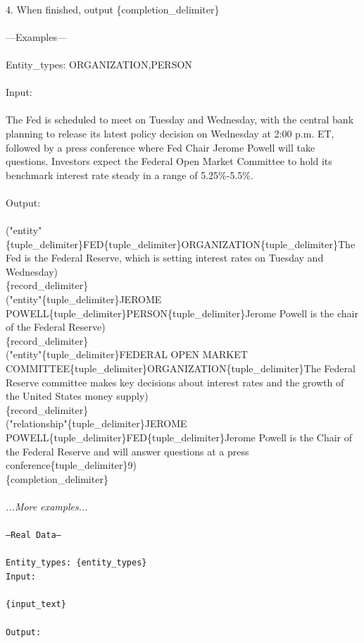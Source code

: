 \documentclass{article}
\begin{document}
{\\
4. When finished, output \{completion\_delimiter\}\\
\\
---Examples---\\
\\
Entity\_types: ORGANIZATION,PERSON\\
\\
Input:\\
\\
The Fed is scheduled to meet on Tuesday and Wednesday, with the central bank planning to release its latest policy decision on Wednesday at 2:00 p.m. ET, followed by a press conference where Fed Chair Jerome Powell will take questions. Investors expect the Federal Open Market Committee to hold its benchmark interest rate steady in a range of 5.25\%-5.5\%.\\
\\
Output:\\
\\
("entity"\{tuple\_delimiter\}FED\{tuple\_delimiter\}ORGANIZATION\{tuple\_delimiter\}The Fed is the Federal Reserve, which is setting interest rates on Tuesday and Wednesday)\\
\{record\_delimiter\}\\
("entity"\{tuple\_delimiter\}JEROME POWELL\{tuple\_delimiter\}PERSON\{tuple\_delimiter\}Jerome Powell is the chair of the Federal Reserve)\\
\{record\_delimiter\}\\
("entity"\{tuple\_delimiter\}FEDERAL OPEN MARKET COMMITTEE\{tuple\_delimiter\}ORGANIZATION\{tuple\_delimiter\}The Federal Reserve committee makes key decisions about interest rates and the growth of the United States money supply)\\
\{record\_delimiter\}\\
("relationship"\{tuple\_delimiter\}JEROME POWELL\{tuple\_delimiter\}FED\{tuple\_delimiter\}Jerome Powell is the Chair of the Federal Reserve and will answer questions at a press conference\{tuple\_delimiter\}9)\\
\{completion\_delimiter\}\\
}
\textit{\\
...More examples...\\
\\}
\texttt{---Real Data---\\
\\
Entity\_types: \{entity\_types\}\\
Input:\\
\\
\{input\_text\}\\
\\
Output:}
\end{document}
